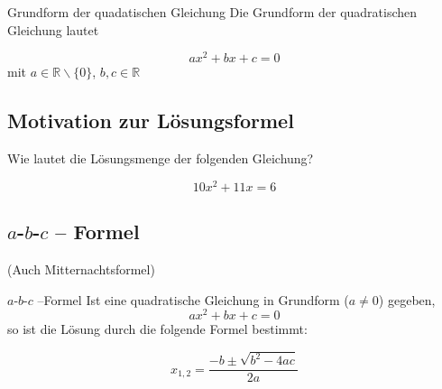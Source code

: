 \begin{definition}{Grundform der quadatischen Gleichung}{}
  Die Grundform der quadratischen Gleichung lautet

  $$ax^2+bx+c=0$$
  mit $a\in \mathbb{R}\backslash\{0\}$, $b, c \in \mathbb{R}$
\end{definition}


\TALS{\newpage
}%


\newpage
\subsection{Motivation zur Lösungsformel}
Wie lautet die Lösungsmenge der folgenden Gleichung?

$$10x^2+11x = 6$$



\newpage
\TALS{}

\newpage



\subsection{$a$-$b$-$c$ -- Formel}
(Auch Mitternachtsformel)



\begin{gesetz}{$a$-$b$-$c$ --Formel}{}
Ist eine quadratische Gleichung in Grundform ($a\ne 0$) gegeben,
$$ax^2 + bx + c = 0$$
so ist die Lösung durch die folgende Formel bestimmt:

$$x_{1,2}=\frac{-b\pm\sqrt{b^2-4ac}}{2a}$$
\end{gesetz}
\newpage


